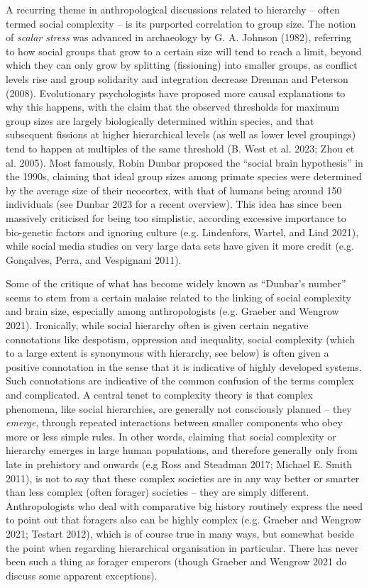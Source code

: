 \documentclass[
  12pt,
  a4paper, twoside]{book}
\begin{document}
A recurring theme in anthropological discussions related to hierarchy -- often termed social complexity -- is its purported correlation to group size. The notion of \emph{scalar stress} was advanced in archaeology by G. A. Johnson (1982), referring to how social groups that grow to a certain size will tend to reach a limit, beyond which they can only grow by splitting (fissioning) into smaller groups, as conflict levels rise and group solidarity and integration decrease Drennan and Peterson (2008). Evolutionary psychologists have proposed more causal explanations to why this happens, with the claim that the observed thresholds for maximum group sizes are largely biologically determined within species, and that subsequent fissions at higher hierarchical levels (as well as lower level groupings) tend to happen at multiples of the same threshold (B. West et al. 2023; Zhou et al. 2005). Most famously, Robin Dunbar proposed the ``social brain hypothesis'' in the 1990s, claiming that ideal group sizes among primate species were determined by the average size of their neocortex, with that of humans being around 150 individuals (see Dunbar 2023 for a recent overview). This idea has since been massively criticised for being too simplistic, according excessive importance to bio-genetic factors and ignoring culture (e.g. Lindenfors, Wartel, and Lind 2021), while social media studies on very large data sets have given it more credit (e.g. Gonçalves, Perra, and Vespignani 2011).

Some of the critique of what has become widely known as ``Dunbar's number'' seems to stem from a certain malaise related to the linking of social complexity and brain size, especially among anthropologists (e.g. Graeber and Wengrow 2021). Ironically, while social hierarchy often is given certain negative connotations like despotism, oppression and inequality, social complexity (which to a large extent is synonymous with hierarchy, see below) is often given a positive connotation in the sense that it is indicative of highly developed systems. Such connotations are indicative of the common confusion of the terms complex and complicated. A central tenet to complexity theory is that complex phenomena, like social hierarchies, are generally not consciously planned -- they \emph{emerge}, through repeated interactions between smaller components who obey more or less simple rules. In other words, claiming that social complexity or hierarchy emerges in large human populations, and therefore generally only from late in prehistory and onwards (e.g Ross and Steadman 2017; Michael E. Smith 2011), is not to say that these complex societies are in any way better or smarter than less complex (often forager) societies -- they are simply different. Anthropologists who deal with comparative big history routinely express the need to point out that foragers also can be highly complex (e.g. Graeber and Wengrow 2021; Testart 2012), which is of course true in many ways, but somewhat beside the point when regarding hierarchical organisation in particular. There has never been such a thing as forager emperors (though Graeber and Wengrow 2021 do discuss some apparent exceptions).
\end{document}
